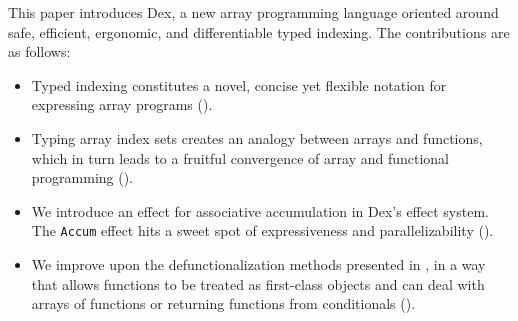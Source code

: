 \documentclass[acmsmall,screen,nonacm]{acmart}
\begin{document}
This paper introduces Dex, a new array programming language oriented around safe, efficient, ergonomic, and differentiable typed indexing.
The contributions are as follows:
\begin{itemize}
  \item Typed indexing constitutes a novel, concise yet flexible notation for expressing array programs ().
  \item Typing array index sets creates an analogy between
  arrays and functions, which in turn leads to a fruitful convergence of array and functional
  programming ().
  \item We introduce an effect for associative accumulation in Dex's effect system. The \texttt{Accum} effect hits a sweet spot of expressiveness and parallelizability (). %
  \item We improve upon the defunctionalization methods presented in \citet{hovgaard2018high}, in a way that allows functions to be treated as first-class objects and can deal with arrays of functions or returning functions from conditionals ().

\end{itemize}
\end{document}
